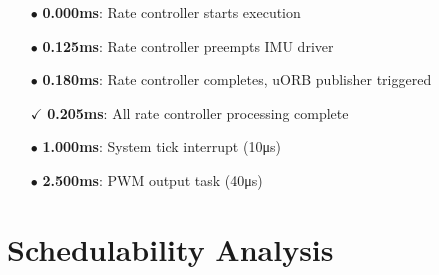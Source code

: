 \documentclass[landscape,a4paper]{article}
\begin{document}
\begin{tcolorbox}[colback=px4blue!5,colframe=px4blue,width=\textwidth,arc=2mm,boxrule=1.5pt,title=\textbf{Cycle 1 Analysis (0-4ms)},fonttitle=\bfseries]
\begin{itemize}[leftmargin=1em]
    \item[\color{ratecontrol}$\bullet$] \textbf{0.000ms}: Rate controller starts execution
    \item[\color{ratecontrol}$\bullet$] \textbf{0.125ms}: Rate controller preempts IMU driver
    \item[\color{uorbpub}$\bullet$] \textbf{0.180ms}: Rate controller completes, uORB publisher triggered
    \item[\color{px4green}$\checkmark$] \textbf{0.205ms}: All rate controller processing complete
    \item[\color{systick}$\bullet$] \textbf{1.000ms}: System tick interrupt (10μs)
    \item[\color{pwmout}$\bullet$] \textbf{2.500ms}: PWM output task (40μs)
\end{itemize}
\end{tcolorbox}

\section{Schedulability Analysis}
\end{document}
